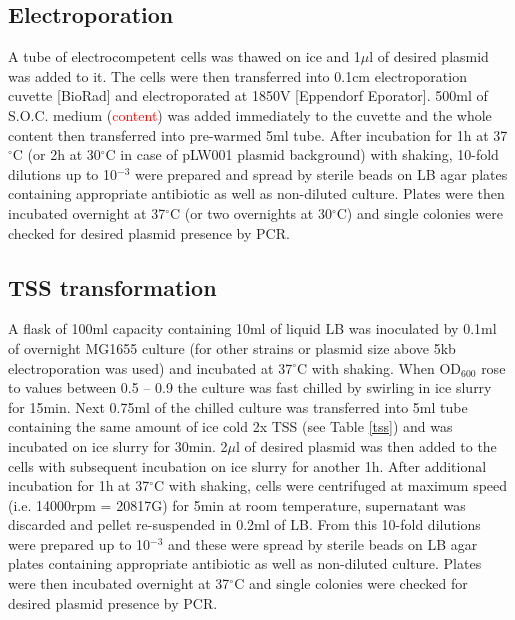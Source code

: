 \subsection{Electroporation}
A tube of electrocompetent cells was thawed on ice and 1$\mu$l of desired plasmid was added to it.
The cells were then transferred into 0.1cm electroporation cuvette [BioRad] and electroporated at 1850V [Eppendorf Eporator\textsuperscript{\textregistered}].
500ml of S.O.C. medium (\textcolor{red}{content}) was added immediately to the cuvette and the whole content then transferred into pre-warmed 5ml tube.
After incubation for 1h at 37$^{\circ}$C (or 2h at 30$^{\circ}$C in case of pLW001 plasmid background) with shaking, 10-fold dilutions up to 10$^{-3}$ were prepared and spread by sterile beads on LB agar plates containing appropriate antibiotic as well as non-diluted culture.
Plates were then incubated overnight at 37$^{\circ}$C (or two overnights at 30$^{\circ}$C) and single colonies were checked for desired plasmid presence by PCR.

\subsection{TSS transformation}
A flask of 100ml capacity containing 10ml of liquid LB was inoculated by 0.1ml of overnight MG1655 culture (for other strains or plasmid size above 5kb electroporation was used) and incubated at 37$^{\circ}$C with shaking.
When OD$_{600}$ rose to values between 0.5 -- 0.9 the culture was fast chilled by swirling in ice slurry for 15min.
Next 0.75ml of the chilled culture was transferred into 5ml tube containing the same amount of ice cold 2x TSS (see Table \ref{tss}) and was incubated on ice slurry for 30min.
2$\mu$l of desired plasmid was then added to the cells with subsequent incubation on ice slurry for another 1h.
After additional incubation for 1h at 37$^{\circ}$C with shaking, cells were centrifuged at maximum speed (i.e. 14000rpm = 20817G) for 5min at room temperature, supernatant was discarded and pellet re-suspended in 0.2ml of LB.
From this 10-fold dilutions were prepared up to 10$^{-3}$ and these were spread by sterile beads on LB agar plates containing appropriate antibiotic as well as non-diluted culture.
Plates were then incubated overnight at 37$^{\circ}$C and single colonies were checked for desired plasmid presence by PCR.

